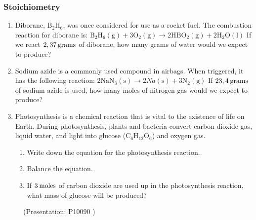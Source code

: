             \subsubsection{  Stoichiometry
      }
            \nopagebreak
      \label{m38712*id285393}\begin{enumerate}[noitemsep, label=\textbf{\arabic*}. ] 
            \label{m38712*uid101}\item Diborane, $\mathrm{B}{}_{2}\mathrm{H}{}_{6}$, was once considered for use as a rocket fuel. The combustion reaction for diborane is:
${\mathrm{B}}_{2}{\mathrm{H}}_{6}\left(\mathrm{g}\right)+3{\mathrm{O}}_{2}\left(\mathrm{g}\right)\to 2\mathrm{H}\mathrm{B}{\mathrm{O}}_{2}\left(\mathrm{g}\right)+2{\mathrm{H}}_{2}\mathrm{O}\left(\mathrm{l}\right)$
If we react $2,37\phantom{\rule{2pt}{0ex}}\mathrm{grams}$ of diborane, how many grams of water would we expect to produce?\newline
\label{m38712*uid102}\item Sodium azide is a commonly used compound in airbags. When triggered, it has the following reaction:
$2{\mathrm{NaN}}_{3}\left(\mathrm{s}\right)\to 2Na\left(\mathrm{s}\right)+3{\mathrm{N}}_{2}\left(\mathrm{g}\right)$
If $23,4\phantom{\rule{2pt}{0ex}}\mathrm{grams}$ of sodium azide is used, how many moles of nitrogen gas would we expect to produce?\newline
\label{m38712*uid103}\item Photosynthesis is a chemical reaction that is vital to the existence of life on Earth. During photosynthesis, plants and bacteria convert carbon dioxide gas, liquid water, and light into glucose ($\mathrm{C}{}_{6}\mathrm{H}{}_{12}\mathrm{O}{}_{6}$) and oxygen gas.
\label{m38712*id285674}\begin{enumerate}[noitemsep, label=\textbf{\alph*}. ] 
            \label{m38712*uid104}\item Write down the equation for the photosynthesis reaction.
\label{m38712*uid105}\item Balance the equation.
\label{m38712*uid106}\item If $3\phantom{\rule{2pt}{0ex}}\mathrm{moles}$ of carbon dioxide are used up in the photosynthesis reaction, what mass of glucose will be produced?
\end{enumerate}
                \end{enumerate}
    \label{m38712*eip-269}
    \setcounter{subfigure}{0}
	\begin{figure}[H] %
    \label{m38712*slidesharemedia}\label{m38712*slideshareflash}
             { (Presentation:  P10090 )}
      \vspace{2pt}
    \vspace{.1in}
 \end{figure}       \par \label{m38712*cid10}
